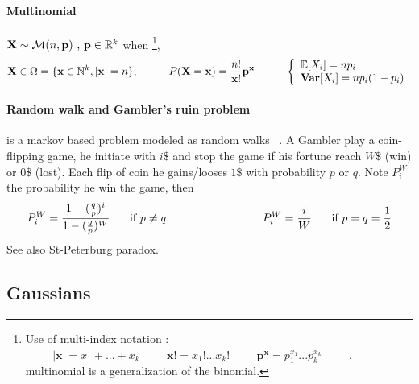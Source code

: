 \documentclass[a4paper,10pt]{article}
\begin{document}
\paragraph{Multinomial}  $ \textbf{X} \sim \mathcal{M}(n,\textbf{p} ) \hbox{ , } \textbf{p}\in \mathbb{R}^k $ when \footnote{Use of multi-index notation : $ \hspace{1cm} |\textbf{x}|=x_1 + ... + x_k \hspace{1cm} \textbf{x}!=x_1! ... x_k!  \hspace{1cm} \textbf{p}^{\textbf{x}} = p_1^{x_1}...p_k^{x_k}  \hspace{1cm} $, multinomial is a generalization of the binomial.},
\[
\textbf{X} \in \Omega = \{ \textbf{x} \in \mathbb{N}^k, |\textbf{x}| = n \} , 
\hspace{10mm}
P(\textbf{X}=\textbf{x})= \frac{n!}{\textbf{x}!}\textbf{p}^{\textbf{x}}
\hspace{10mm}
\left\{
\begin{array}{l}
\mathbb{E}[X_i]=np_i \\
\textbf{Var}[X_i]=n p_i (1-p_i) 
\end{array}\right.
\]
\paragraph{Random walk and Gambler's ruin problem} is a markov based problem modeled as random walks ~\cite{KARL}. A Gambler play a coin-flipping game, he initiate with $i\$$ and stop the game if his fortune reach $W\$$ (win) or $0\$$ (lost). Each flip of coin he gains/looses $1\$$ with probability $p \text{ or } q$. Note $P_i^{W}$ the probability he win the game, then
\[
P_i^{W} = \frac{1- (\frac{q}{p})^i }{1- (\frac{q}{p})^W } \hspace{0.5cm} \text{  if } p\neq q
\hspace{3cm}
P_i^{W} = \frac{i}{W} \hspace{0.5cm}\text{  if } p = q = \frac{1}{2}
\]
See also St-Peterburg paradox.
\subsection{Gaussians}
\end{document}
